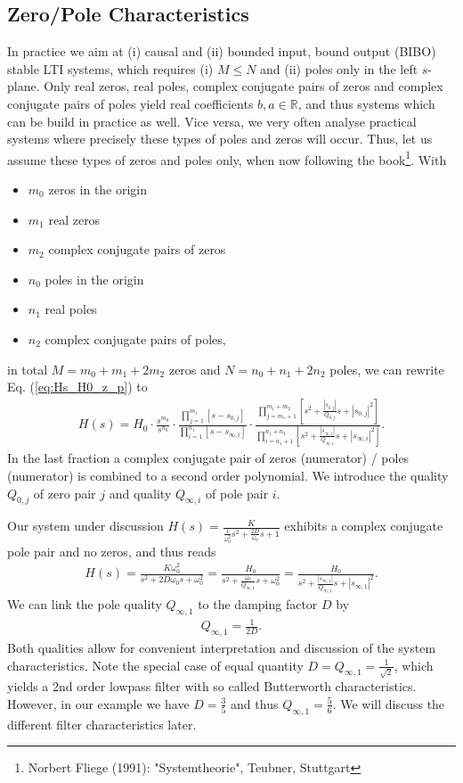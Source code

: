 \documentclass[a4paper,11pt,oneside]{scrartcl}
\newcommand{\eq}[1]{Eq. (\ref{#1})}
\begin{document}
\subsection{Zero/Pole Characteristics}
In practice we aim at (i) causal and (ii) bounded input, bound output (BIBO)
stable LTI systems, which requires (i) $M\leq N$ and (ii)
poles only in the left $s$-plane.
%
Only real zeros, real poles, complex conjugate pairs of zeros and
complex conjugate pairs of poles yield
real coefficients $b,a \in \mathbb{R}$, and thus systems which can be build in
practice as well.
%
Vice versa, we very often analyse practical systems where precisely these types
of poles and zeros will occur.
%
Thus, let us assume these types of zeros and poles only, when now following the
book\footnote{Norbert Fliege (1991): "Systemtheorie", Teubner, Stuttgart}.
%
With
\begin{itemize}
\item $m_0$ zeros in the origin
\item $m_1$ real zeros
\item $m_2$ complex conjugate pairs of zeros
\item $n_0$ poles in the origin
\item $n_1$ real poles
\item $n_2$ complex conjugate pairs of poles,
\end{itemize}
in total $M = m_0 + m_1 + 2 m_2$ zeros and $N = n_0 + n_1 + 2 n_2$ poles,
we can rewrite \eq{eq:Hs_H0_z_p} to
\begin{align}
\label{eq:Hs_sorted_for_Bode}
H(s) = H_0
\cdot
\frac
{s^{m_0}}
{s^{n_0}}
\cdot
\frac
{\prod\limits_{j=1}^{m_1} [s-s_{0,j}]}
{\prod\limits_{i=1}^{n_1} [s-s_{\infty,i}]}
\cdot
\frac
{\prod\limits_{j=m_1+1}^{m_1+m_2} [s^2 + \frac{|s_{0,j}|}{Q_{0,j}} s + |s_{0,j}|^2]}
{\prod\limits_{i=n_1+1}^{n_1+n_2} [s^2 + \frac{|s_{\infty,i}|}{Q_{\infty,i}} s + |s_{\infty,i}|^2]}.
\end{align}
%
In the last fraction a complex conjugate pair of zeros (numerator)
/ poles (numerator) is combined to a second order polynomial.
We introduce the quality $Q_{0,j}$ of zero pair $j$ and
quality $Q_{\infty,i}$ of pole pair $i$.

Our system under discussion
$H(s) = \frac{K}{\frac{1}{\omega_0^2} s^2 + \frac{2 D}{\omega_0} s + 1}$
exhibits a complex conjugate pole pair and no zeros, and thus reads
\begin{align}
H(s) = \frac{K \omega_0^2}{s^2 + 2 D \omega_0 s + \omega_0^2} =
\frac{H_0}{s^2 + \frac{\omega_0}{Q_{\infty,1}} s + \omega_0^2} =
\frac{H_0}{s^2 + \frac{|s_{\infty,1}|}{Q_{\infty,1}} s + |s_{\infty,1}|^2}.
\end{align}
We can link the pole quality $Q_{\infty,1} $ to the damping factor $D$ by
\begin{align}
Q_{\infty,1} = \frac{1}{2 D}.
\end{align}
Both qualities allow for convenient interpretation and discussion of the
system characteristics. Note the special case of equal quantity
$D = Q_{\infty,1} = \frac{1}{\sqrt{2}}$, which yields a 2nd order
lowpass filter with so called Butterworth characteristics.
However, in our example we
have $D=\frac{3}{5}$ and thus $Q_{\infty,1} = \frac{5}{6}$.
We will discuss the different filter characteristics later.
\end{document}

